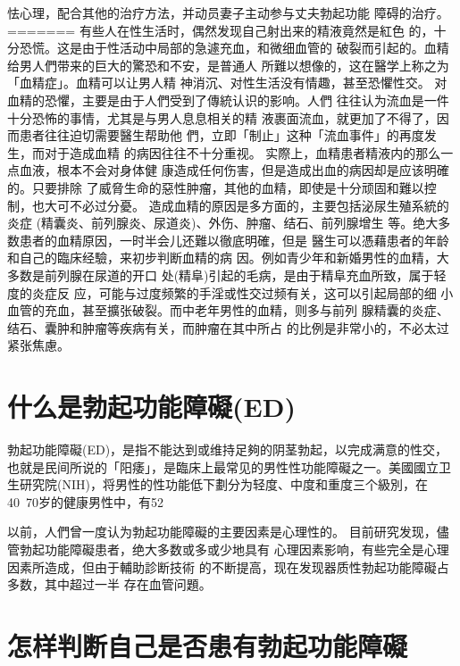 \documentclass[12pt,UTF8]{ctexbook}
\begin{document}
怯心理，配合其他的治疗方法，并动员妻子主动参与丈夫勃起功能
障碍的治疗。
=======
有些人在性生活时，偶然发现自己射出来的精液竟然是紅色
的，十分恐慌。这是由于性活动中局部的急遽充血，和微细血管的
破裂而引起的。血精给男人們带来的巨大的驚恐和不安，是普通人
所難以想像的，这在醫学上称之为「血精症」。血精可以让男人精
神消沉、对性生活没有情趣，甚至恐懼性交。
对血精的恐懼，主要是由于人們受到了傳統认识的影响。人們
往往认为流血是一件十分恐怖的事情，尤其是与男人息息相关的精
液裹面流血，就更加了不得了，因而患者往往迫切需要醫生帮助他
們，立即「制止」这种「流血事件」的再度发生，而对于造成血精
的病因往往不十分重视。
实際上，血精患者精液内的那么一点血液，根本不会对身体健
康造成任何伤害，但是造成出血的病因却是应该明確的。只要排除
了威脅生命的惡性肿瘤，其他的血精，即使是十分顽固和難以控
制，也大可不必过分憂。
造成血精的原因是多方面的，主要包括泌尿生殖系統的炎症
(精囊炎、前列腺炎、尿道炎)、外伤、肿瘤、结石、前列腺增生
等。绝大多数患者的血精原因，一时半会儿还難以徹底明確，但是
醫生可以憑藉患者的年龄和自己的臨床经驗，来初步判断血精的病
因。例如青少年和新婚男性的血精，大多数是前列腺在尿道的开口
处(精阜)引起的毛病，是由于精阜充血所致，属于轻度的炎症反
应，可能与过度频繁的手淫或性交过频有关，这可以引起局部的细
小血管的充血，甚至擴张破裂。而中老年男性的血精，则多与前列
腺精囊的炎症、结石、囊肿和肿瘤等疾病有关，而肿瘤在其中所占
的比例是非常小的，不必太过紧张焦慮。

\section{什么是勃起功能障礙(ED)}

勃起功能障礙(ED)，是指不能达到或维持足夠的阴茎勃起，以完成满意的性交，也就是民间所说的「阳痿」，是臨床上最常见的男性性功能障礙之一。美國國立卫生研究院(NIH)，将男性的性功能低下劃分为轻度、中度和重度三个級別，在40~70岁的健康男性中，有52%

以前，人們曾一度认为勃起功能障礙的主要因素是心理性的。
目前研究发现，儘管勃起功能障礙患者，绝大多数或多或少地具有
心理因素影响，有些完全是心理因素所造成，但由于輔助診断技術
的不断提高，现在发现器质性勃起功能障礙占多数，其中超过一半
存在血管问題。

\section{怎样判断自己是否患有勃起功能障礙}
\end{document}
